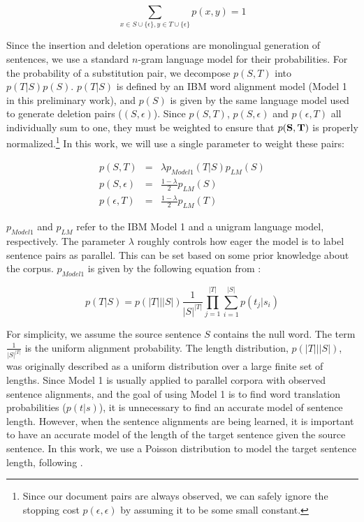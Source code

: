 \begin{equation}
\sum_{x \in S\cup \{\epsilon\}, y \in T\cup \{\epsilon\}} p(x,y) = 1
\end{equation}

Since the insertion and deletion operations are monolingual generation of
sentences, we use a standard $n$-gram language model for their probabilities.
For the probability of a substitution pair, we decompose $p(S,T)$ into
$p(T|S)p(S)$. $p(T|S)$ is defined by an IBM word alignment model \citep{Brown93}
(Model 1 in this preliminary work), and $p(S)$ is given by the same language
model used to generate deletion pairs ($(S,\epsilon)$). Since $p(S,T)$,
$p(S,\epsilon)$ and $p(\epsilon,T)$ all individually sum to one, they must be
weighted to ensure that $p({\bf S},{\bf T})$ is properly
normalized.\footnote{Since our document pairs are always observed, we can safely
ignore the stopping cost $p(\epsilon, \epsilon)$ by assuming it to be some small
constant.} In this work, we will use a single parameter to weight these pairs:

\begin{align*}
p(S,T) &=& \lambda p_{Model1}(T|S) p_{LM}(S)\\
p(S,\epsilon) &=& \frac{1-\lambda}{2} p_{LM}(S)\\
p(\epsilon,T) &=& \frac{1-\lambda}{2} p_{LM}(T)
\end{align*}

$p_{Model1}$ and $p_{LM}$ refer to the IBM Model 1 and a unigram language model,
respectively. The parameter $\lambda$ roughly controls how eager the model
is to label sentence pairs as parallel. This can be set based on some prior
knowledge about the corpus.
$p_{Model1}$ is given by the
following equation from \citep{Brown93}:

\begin{equation}
p(T|S) = p\left(|T|\big||S|\right) \frac{1}{|S|^{|T|}}
\prod_{j=1}^{|T|} \sum_{i=1}^{|S|} p(t_j|s_i)
\end{equation}

For simplicity, we assume the source sentence $S$ contains the null word. The
term $\frac{1}{|S|^{|T|}}$ is the uniform alignment probability. The
length distribution, $p\left(|T|\big||S|\right)$, was originally described as a uniform distribution
over a large finite set of lengths. Since Model 1 is usually applied to parallel
corpora with observed sentence alignments, and the goal of using Model 1 is to
find word translation probabilities ($p(t|s)$), it is unnecessary to find an
accurate model of sentence length. However, when the sentence alignments are
being learned, it is important to have an accurate model of the length of the
target sentence given the source sentence. In this work, we use a Poisson
distribution to model the target sentence length, following \citet{Moore02}.

